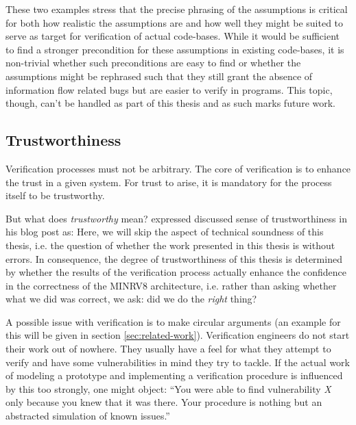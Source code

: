 These two examples stress that the precise phrasing of the assumptions is critical for both how realistic the assumptions are and how well they might be suited to serve as target for verification of actual code-bases.
While it would be sufficient to find a stronger precondition for these assumptions in existing code-bases, it is non-trivial whether such preconditions are easy to find or whether the assumptions might be rephrased such that they still grant the absence of information flow related bugs but are easier to verify in programs.
This topic, though, can't be handled as part of this thesis and as such marks future work.

\subsection{Trustworthiness}
\label{sec:trustworthiness}

Verification processes must not be arbitrary.
The core of verification is to enhance the trust in a given system.
For trust to arise, it is mandatory for the process itself to be trustworthy.

But what does \textit{trustworthy} mean?
\citeauthor{Piano} expressed discussed sense of trustworthiness in his blog post  as:
Here, we will skip the aspect of technical soundness of this thesis, i.e. the question of whether the work presented in this thesis is without errors.
In consequence, the degree of trustworthiness of this thesis is determined by whether the results of the verification process actually enhance the confidence in the correctness of the MINRV8 architecture, i.e. rather than asking whether what we did was correct, we ask: did we do the \textit{right} thing?

A possible issue with verification is to make circular arguments (an example for this will be given in section \ref{sec:related-work}).
Verification engineers do not start their work out of nowhere.
They usually have a feel for what they attempt to verify and have some vulnerabilities in mind they try to tackle.
If the actual work of modeling a prototype and implementing a verification procedure is influenced by this too strongly, one might object:
\enquote{You were able to find vulnerability \textit{X} only because you knew that it was there. Your procedure is nothing but an abstracted simulation of known issues.}

